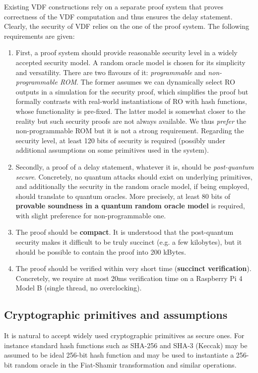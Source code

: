 \documentclass{article}
\begin{document}
Existing VDF constructions rely on a separate proof system that proves correctness of the VDF computation and thus ensures the delay statement. Clearly, the security of VDF relies on the one of the proof system.  The following requirements are given:
\begin{enumerate}
    \item First, a proof system should provide reasonable security level in a widely accepted security model. A random oracle model is chosen for its simplicity and versatility. There are two flavours of it:   \emph{programmable} and \emph{non-programmable ROM}. The former assumes we can dynamically select RO outputs in a simulation for the security proof, which simplifies the proof but formally contrasts with real-world instantiations of RO with hash functions, whose functionality is pre-fixed. The latter model is somewhat closer to the reality but such security proofs are not always available. We thus \emph{prefer}  the non-programmable ROM but it is not a strong requirement. Regarding the security level, at least 120 bits of security is required  (possibly under additional assumptions on some primitives used in the system).
    \item Secondly, a proof of a delay statement, whatever it is, should be \emph{post-quantum secure}.  Concretely, no quantum attacks should exist on underlying primitives, and additionally the security in the random oracle model, if being employed, should translate to quantum oracles. More precisely, at least 80 bits of \textbf{provable soundness in a quantum random oracle model} is required, with slight preference for non-programmable one.
    \item The proof should be \textbf{compact}. It is understood that the post-quantum security makes it difficult to be truly succinct (e.g. a few kilobytes), but it should be possible to contain the proof into 200 kBytes.
    \item The proof should be  verified within very short time (\textbf{succinct verification}). Concretely, we require at most 20ms verification time on a Raspberry Pi 4 Model B (single thread, no overclocking).
\end{enumerate}

\subsection{Cryptographic primitives and assumptions}

It is natural to accept widely used cryptographic primitives as secure ones. For instance standard hash functions such as SHA-256 and SHA-3 (Keccak)   may be assumed to be ideal 256-bit hash function and may be used to instantiate a 256-bit random oracle in the Fiat-Shamir transformation  and similar operations. 
\end{document}
